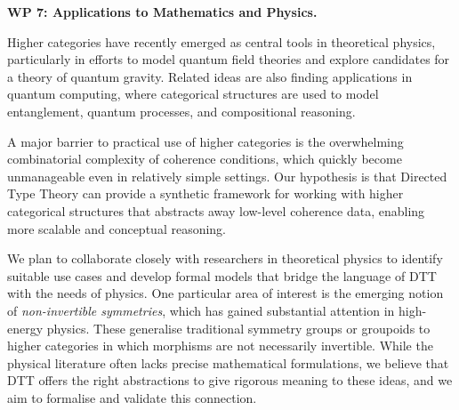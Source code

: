 \documentclass[a4paper,11pt]{article}
\renewcommand{\paragraph}[1]{\textbf{#1.}}
\begin{document}



\paragraph{WP 7: Applications to Mathematics and Physics}

Higher categories have recently emerged as central tools in
theoretical physics, particularly in efforts to model quantum field
theories and explore candidates for a theory of quantum
gravity. Related ideas are also finding applications in quantum
computing, where categorical structures are used to model
entanglement, quantum processes, and compositional reasoning.

A major barrier to practical use of higher categories is the
overwhelming combinatorial complexity of coherence conditions, which
quickly become unmanageable even in relatively simple settings. Our
hypothesis is that Directed Type Theory can provide a synthetic
framework for working with higher categorical structures that
abstracts away low-level coherence data, enabling more scalable and
conceptual reasoning.

We plan to collaborate closely with researchers in theoretical physics
to identify suitable use cases and develop formal models that bridge
the language of DTT with the needs of physics. One particular area of
interest is the emerging notion of \emph{non-invertible symmetries},
which has gained substantial attention in high-energy physics. These
generalise traditional symmetry groups or groupoids to higher
categories in which morphisms are not necessarily invertible. While
the physical literature often lacks precise mathematical formulations,
we believe that DTT offers the right abstractions to give rigorous
meaning to these ideas, and we aim to formalise and validate this
connection.
\end{document}
